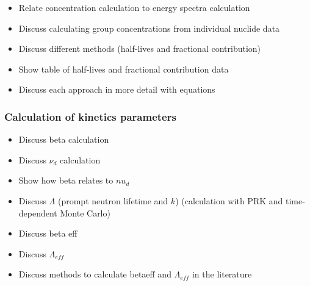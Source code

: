\begin{itemize}
    \item Relate concentration calculation to energy spectra calculation
    \item Discuss calculating group concentrations from individual nuclide data
    \item Discuss different methods (half-lives and fractional contribution)
    \item Show table of half-lives and fractional contribution data
    \item Discuss each approach in more detail with equations
\end{itemize}


\subsubsection{Calculation of kinetics parameters}
\label{ref:calc-kinetic-param}

\begin{itemize}
    \item Discuss beta calculation
    \item Discuss $\nu_d$ calculation
    \item Show how beta relates to $nu_d$
    \item Discuss $\Lambda$ (prompt neutron lifetime and $k$) (calculation with PRK and time-dependent Monte Carlo)
    \item Discuss beta eff
    \item Discuss $\Lambda_{eff}$
    \item Discuss methods to calculate betaeff and $\Lambda_{eff}$ in the literature
\end{itemize}